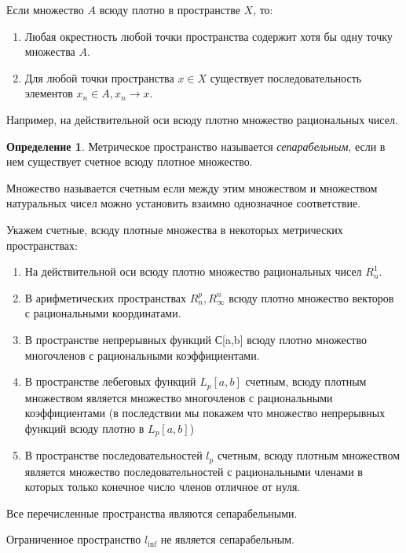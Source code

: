 \documentclass[14pt,a4paper]{extarticle}
\theoremstyle{definition}
\newtheorem{definition}{Определение}[section]
\theoremstyle{remark}
\renewcommand{\[}{\begin{dmath*}[compact]}
\renewcommand{\]}{\end{dmath*}}
\newcommand{\be}{\begin{enumerate}}
\newcommand{\ee}{\end{enumerate}}
\begin{document}
Если множество $A$ всюду плотно в пространстве $X$, то:

\be
  \item Любая окрестность любой точки пространства содержит хотя бы одну точку
  множества $A$. %

  \item Для любой точки пространства $x \in X$  существует последовательность
  элементов ${x_n}\in A, x_n \to x$. %
\ee

Например, на действительной оси всюду плотно множество рациональных чисел.

\begin{definition}
  Метрическое пространство называется \textit{сепарабельным},
  если в нем существует счетное всюду плотное множество.
\end{definition}

Множество называется счетным если между этим множеством и множеством
натуральных чисел можно установить взаимно однозначное соответствие.

Укажем счетные, всюду плотные множества в некоторых метрических пространствах:

\begin{enumerate}
  \item На действительной оси всюду плотно множество рациональных чисел $R_n^1$.

  \item В арифметических пространствах $R_n^p, R_\infty^n$ всюду плотно
  множество векторов с рациональными координатами.

  \item В пространстве непрерывных функций С[a,b] всюду плотно множество
  многочленов с рациональными коэффициентами.

  \item В пространстве лебеговых функций $L_p[a,b]$ счетным, всюду плотным
  множеством является множество многочленов с рациональными коэффициентами (в
  последствии мы покажем что множество непрерывных функций всюду плотно в
  $L_p[a,b]$)

  \item В пространстве последовательностей $l_p$ счетным, всюду плотным
  множеством является множество последовательностей с рациональными членами в
  которых только конечное число членов отличное от нуля.
\end{enumerate}

Все перечисленные пространства являются сепарабельными.

Ограниченное пространство $l_{\inf}$ не является сепарабельным.
\end{document}
